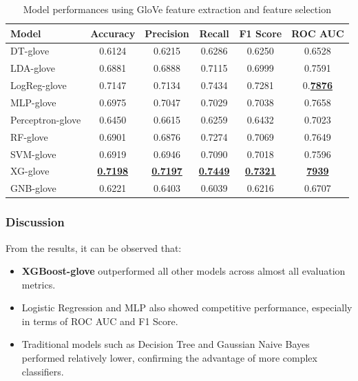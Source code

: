 \begin{table}[h!]
\centering
\begin{tabular}{lccccc}
\toprule
\textbf{Model} & \textbf{Accuracy} & \textbf{Precision} & \textbf{Recall} & \textbf{F1 Score} & \textbf{ROC AUC} \\
\midrule
DT-glove & 0.6124 & 0.6215 & 0.6286 & 0.6250 & 0.6528 \\
LDA-glove & 0.6881 & 0.6888 & 0.7115 & 0.6999 & 0.7591 \\
LogReg-glove & 0.7147 & 0.7134 & 0.7434 & 0.7281 & 0.\textbf{\underline{7876}} \\
MLP-glove & 0.6975 & 0.7047 & 0.7029 & 0.7038 & 0.7658 \\
Perceptron-glove & 0.6450 & 0.6615 & 0.6259 & 0.6432 & 0.7023 \\
RF-glove & 0.6901 & 0.6876 & 0.7274 & 0.7069 & 0.7649 \\
SVM-glove & 0.6919 & 0.6946 & 0.7090 & 0.7018 & 0.7596 \\
XG-glove & \textbf{\underline{0.7198}} & \textbf{\underline{0.7197}} & \textbf{\underline{0.7449}} & \textbf{\underline{0.7321}} & \textbf{\underline{7939}} \\
GNB-glove & 0.6221 & 0.6403 & 0.6039 & 0.6216 & 0.6707 \\
\bottomrule
\end{tabular}
\caption{Model performances using GloVe feature extraction and feature selection}
\end{table}

\subsubsection{Discussion}
From the results, it can be observed that:
\begin{itemize}
    \item \textbf{XGBoost-glove} outperformed all other models across almost all evaluation metrics.
    \item Logistic Regression and MLP also showed competitive performance, especially in terms of ROC AUC and F1 Score.
    \item Traditional models such as Decision Tree and Gaussian Naive Bayes performed relatively lower, confirming the advantage of more complex classifiers.
\end{itemize}